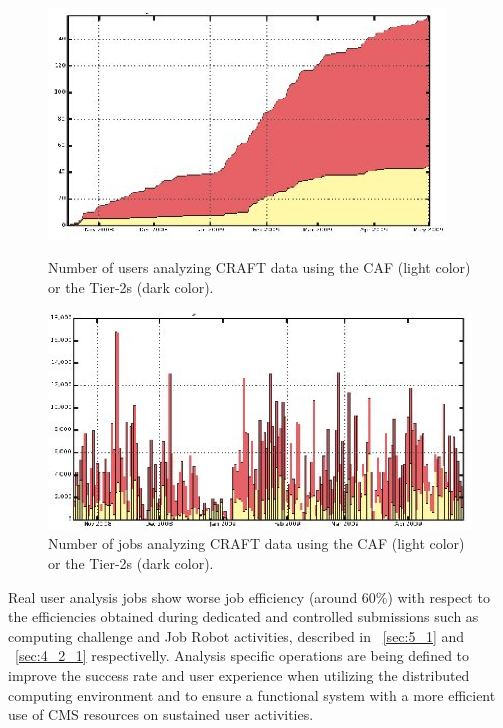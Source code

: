 %
\begin{figure}
\begin{minipage}{.48\textwidth}
\centering
\includegraphics[width=0.94\textwidth]{CRAFTusers.eps}
\caption{Number of users analyzing CRAFT data using the CAF (light color) or the Tier-2s (dark color).}
\label{fig:CRAFTusers}
\end{minipage}
\begin{minipage}{.48\textwidth}
\centering
\includegraphics[width=1.06\textwidth]{CRAFTjobs.eps}
\caption{Number of jobs analyzing CRAFT data using the CAF (light color) or the Tier-2s (dark color).}
\label{fig:CRAFTjobs}
\end{minipage}
\end{figure}


Real user analysis jobs show worse job efficiency (around 60\%) with respect to the efficiencies obtained during dedicated and controlled submissions such 
as computing challenge and Job Robot activities, described in ~\ref{sec:5_1} and ~\ref{sec:4_2_1} respectivelly.
Analysis specific operations are being defined to improve the success rate and user experience when utilizing the distributed computing environment and to ensure a functional system with a more efficient use of CMS resources on sustained user activities.

